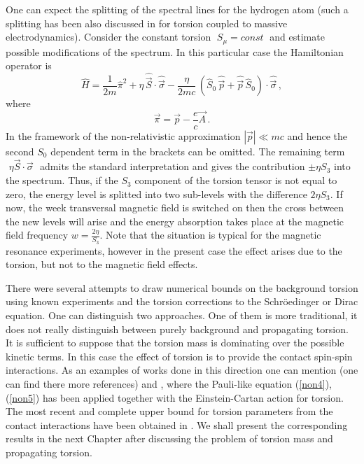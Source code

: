 One can expect the splitting of the spectral lines for 
the hydrogen atom (such a splitting has been also
discussed in \cite{gaha} for torsion coupled to massive
electrodynamics). Consider the constant torsion 
$\;S_\mu = const\;$ and estimate possible modifications
of the spectrum. In this particular case the 
Hamiltonian operator is
$$ %
\hat{H} = \frac{1}{2m}\hat{\pi}^2 
+ \eta\, \hat{\vec{S}}\cdot \hat{\vec{\sigma}}  
- \frac{\eta}{2mc}\,(\hat{S}_0\,\hat{\vec{p}} 
+ \hat{\vec{p}}\,\hat{S}_0 )\cdot \hat{\vec{\sigma}}\,,
$$ %
where
$$
\vec{\pi} = \vec{p} - \frac{e}{c}\vec{A} \,.   
$$
In the framework of the non-relativistic approximation 
$|\vec{p}| \ll
mc$ and hence the second $S_0$ dependent term in the brackets 
can be omitted. The remaining term 
$\,\,\eta\vec{S}\cdot\vec{\sigma}\,\,$ admits the standard
interpretation and gives the contribution $\pm \eta S_3$ into the
spectrum. Thus, if the $S_3$ component of the torsion tensor is not
equal to zero, the energy level is splitted into two sub-levels with
the difference $2 \eta S_3$. If now, the week transversal magnetic
field is switched on then the cross between the new levels will arise
and the energy absorption takes place at the magnetic field frequency 
$w = \frac{2\eta}{S_3}$. Note that the situation is typical for the
magnetic resonance experiments, however in the present case the effect
arises due to the torsion, but not to the magnetic field effects.
\vskip 3mm

There were several attempts to draw numerical bounds on the
background torsion using known experiments and the
torsion corrections to the Schr\"{o}edinger or Dirac equation.
One can distinguish
two approaches. One of them is more traditional, it does not
really distinguish between purely background and propagating
torsion. It is sufficient to suppose that the torsion mass is
dominating over the possible kinetic terms. In this case the
effect of torsion is to provide the contact spin-spin interactions.
As an examples of works done in this direction one can mention
\cite{hehl} (one can find there more references) and \cite{hammond},
where the Pauli-like equation (\ref{non4}), (\ref{non5})
has been applied together with the Einstein-Cartan action for 
torsion. The most recent and complete
upper bound for torsion parameters from the contact interactions
have been obtained in \cite{betor}. We shall present the
corresponding results in the next Chapter after discussing the
problem of torsion mass and propagating torsion.

